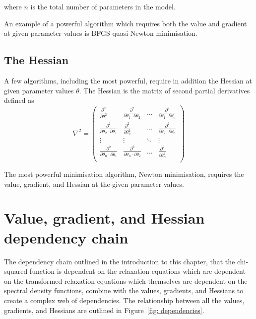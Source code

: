 \noindent where $n$ is the total number of parameters in the model.

An example of a powerful algorithm which requires both the value and gradient at given parameter values is BFGS quasi-Newton minimisation.


\subsection{The Hessian}

A few algorithms, including the most powerful, require in addition the Hessian at given parameter values $\theta$.  The Hessian is the matrix of second partial derivatives defined as
\begin{equation}
 \nabla^2 = \begin{pmatrix}
  \frac{\partial^2}{\partial \theta_1^2}                       & \frac{\partial^2}{\partial \theta_1 \cdot \partial \theta_2}  & \ldots    & \frac{\partial^2}{\partial \theta_1 \cdot \partial \theta_n} \\
  \frac{\partial^2}{\partial \theta_2 \cdot \partial \theta_1} & \frac{\partial^2}{\partial \theta_2^2}                        & \ldots    & \frac{\partial^2}{\partial \theta_2 \cdot \partial \theta_n} \\
  \vdots                                                       & \vdots                                                        & \ddots    & \vdots \\
  \frac{\partial^2}{\partial \theta_n \cdot \partial \theta_1} & \frac{\partial^2}{\partial \theta_n \cdot \partial \theta_2}  & \ldots    & \frac{\partial^2}{\partial \theta_n^2} \\
 \end{pmatrix}
\end{equation}

The most powerful minimisation algorithm, Newton minimisation, requires the value, gradient, and Hessian at the given parameter values.




\section{Value, gradient, and Hessian dependency chain}

The dependency chain outlined in the introduction to this chapter, that the chi-squared function is dependent on the relaxation equations which are dependent on the transformed relaxation equations which themselves are dependent on the spectral density functions, combine with the values, gradients, and Hessians to create a complex web of dependencies.  The relationship between all the values, gradients, and Hessians are outlined in Figure~\ref{fig: dependencies}.

